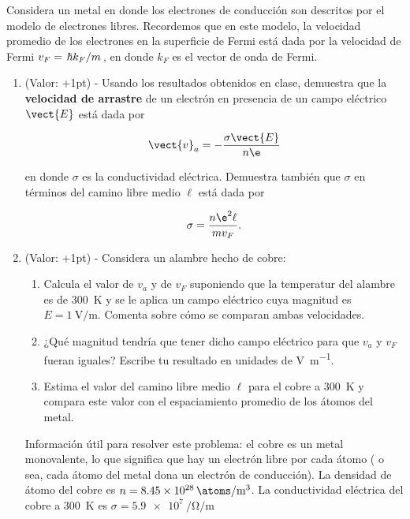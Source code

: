 \documentclass[./../main.tex]{subfiles}
\begin{document}
    \begin{exercisex}
        Considera un metal en donde los electrones de conducción son descritos por el modelo de electrones libres. Recordemos que en este modelo, la velocidad promedio de los electrones en la superficie de Fermi está dada por la velocidad de Fermi \(v_{F} = \slashfrac{\hbar k_{F}}{m}\), en donde \(k_{F}\) es el vector de onda de Fermi.

        \begin{enumerate}
            \item (Valor: +1pt) - Usando los resultados obtenidos en clase, demuestra que la \textbf{velocidad de arrastre} de un electrón en presencia de un campo eléctrico \(\vect{E}\) está dada por
            
            \begin{equation*}
                \vect{v}_{a} = -\dfrac{\sigma\vect{E}}{n\e}
            \end{equation*}

            en donde \(\sigma\) es la conductividad eléctrica. Demuestra también que \(\sigma\) en términos del camino libre medio \(\ell\) está dada por

            \begin{equation*}
                \sigma = \dfrac{n\e^{2}\ell}{mv_{F}}.
            \end{equation*}

            \item (Valor: +1pt) - Considera un alambre hecho de cobre:
                \begin{enumerate}[label = (b.\arabic*)]
                    \item Calcula el valor de \(v_{a}\) y de \(v_{F}\) suponiendo que la temperatur del alambre es de \qty{300}{\kelvin} y se le aplica un campo eléctrico cuya magnitud es \(E = \qty{1}{\V\per\m}\). Comenta sobre cómo se comparan ambas velocidades.
                    \item ¿Qué magnitud tendría que tener dicho campo eléctrico para que \(v_{a}\) y \(v_{F}\) fueran iguales? Escribe tu resultado en unidades de \unit{\V\per\m}.
                    \item Estima el valor del camino libre medio \(\ell\) para el cobre a \qty{300}{\kelvin} y compara este valor con el espaciamiento promedio de los átomos del metal.
                \end{enumerate}

                Información útil para resolver este problema: el cobre es un metal monovalente, lo que significa que hay un electrón libre por cada átomo ( o sea, cada átomo del metal dona un electrón de conducción). La densidad de átomo del cobre es \(n = \qty{8.45e28}{\atoms\per\m\cubed}\). La conductividad eléctrica del cobre a \qty{300}{\K} es \(\sigma = \qty[per-mode=symbol]{5.9e7}{\per\ohm\per\m}\)
        \end{enumerate}
    \end{exercisex}
\end{document}
